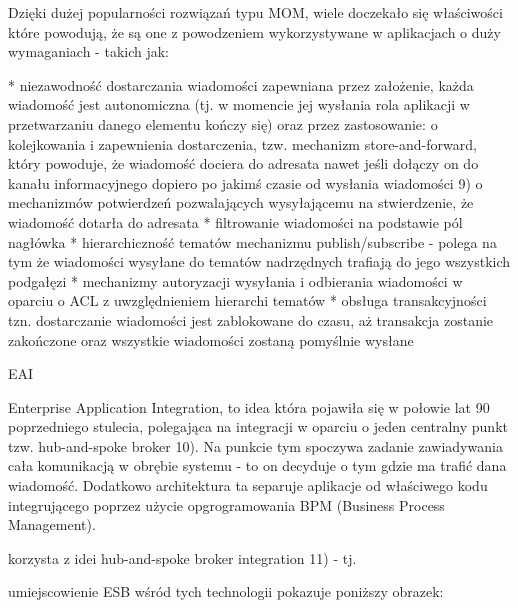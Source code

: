 												  Dzięki dużej popularności rozwiązań typu MOM, wiele doczekało się właściwości które powodują, że są one z powodzeniem wykorzystywane w aplikacjach o duży wymaganiach - takich jak:

												      *
													        niezawodność dostarczania wiadomości zapewniana przez założenie, każda wiadomość jest autonomiczna (tj. w momencie jej wysłania rola aplikacji w przetwarzaniu danego elementu kończy się) oraz przez zastosowanie:
															          o
																	              kolejkowania i zapewnienia dostarczenia, tzw. mechanizm store-and-forward, który powoduje, że wiadomość dociera do adresata nawet jeśli dołączy on do kanału informacyjnego dopiero po jakimś czasie od wysłania wiadomości 9)
																				            o
																							            mechanizmów potwierdzeń pozwalających wysyłającemu na stwierdzenie, że wiadomość dotarła do adresata
																										    *
																											      filtrowanie wiadomości na podstawie pól nagłówka
																												      *
																													        hierarchiczność tematów mechanizmu publish/subscribe - polega na tym że wiadomości wysyłane do tematów nadrzędnych trafiają do jego wszystkich podgałęzi
																															    *
																																      mechanizmy autoryzacji wysyłania i odbierania wiadomości w oparciu o ACL z uwzględnieniem hierarchi tematów
																																	      *
																																		        obsługa transakcyjności tzn. dostarczanie wiadomości jest zablokowane do czasu, aż transakcja zostanie zakończone oraz wszystkie wiadomości zostaną pomyślnie wysłane

																																				EAI

																																				Enterprise Application Integration, to idea która pojawiła się w połowie lat 90 poprzedniego stulecia, polegająca na integracji w oparciu o jeden centralny punkt tzw. hub-and-spoke broker 10). Na punkcie tym spoczywa zadanie zawiadywania cała komunikacją w obrębie systemu - to on decyduje o tym gdzie ma trafić dana wiadomość. Dodatkowo architektura ta separuje aplikacje od właściwego kodu integrującego poprzez użycie opgrogramowania BPM (Business Process Management).

																																				korzysta z idei hub-and-spoke broker integration 11) - tj.

																																				umiejscowienie ESB wśród tych technologii pokazuje poniższy obrazek:

